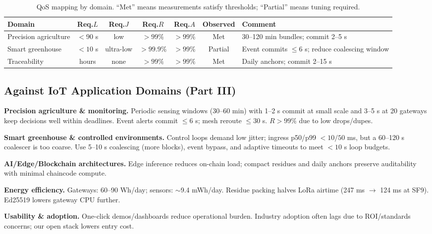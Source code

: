 \documentclass[12pt,onecolumn]{IEEEtran} %
\begin{document}
\begingroup
\setlength{\tabcolsep}{3pt}\footnotesize
\begin{table}[ht]
  \centering
  \caption{QoS mapping by domain. ``Met'' means measurements satisfy thresholds; ``Partial'' means tuning required.}
  \label{tab:qos-map}
  \begin{tabularx}{\textwidth}{l c c c c c X}
    \toprule
    \textbf{Domain} & \textbf{Req.\(L\)} & \textbf{Req.\(J\)} & \textbf{Req.\(R\)} & \textbf{Req.\(A\)} & \textbf{Observed} & \textbf{Comment} \\
    \midrule
    Precision agriculture & $<90$ s & low & $>99\%$ & $>99\%$ & Met & 30–120 min bundles; commit 2–5 s \\
    Smart greenhouse & $<10$ s & ultra-low & $>99.9\%$ & $>99\%$ & Partial & Event commits \(\le\)6 s; reduce coalescing window \\
    Traceability & hours & none & $>99\%$ & $>99\%$ & Met & Daily anchors; commit 2–15 s \\
    \bottomrule
  \end{tabularx}
\end{table}
\endgroup

\subsection{Against IoT Application Domains (Part III)}
\label{subsec:domains}
\textbf{Precision agriculture \& monitoring.} Periodic sensing windows (30–60 min) with 1–2 s commit at small scale and 3–5 s at 20 gateways keep decisions well within deadlines. Event alerts commit \(\le\)6 s; mesh reroute \(\le\)30 s. \(R>99\%\) due to low drops/dupes.

\textbf{Smart greenhouse \& controlled environments.} Control loops demand low jitter; ingress p50/p99 \(<10/50\) ms, but a 60–120 s coalescer is too coarse. Use 5–10 s coalescing (more blocks), event bypass, and adaptive timeouts to meet \(<10\) s loop budgets.

\textbf{AI/Edge/Blockchain architectures.} Edge inference reduces on-chain load; compact residues and daily anchors preserve auditability with minimal chaincode compute.

\textbf{Energy efficiency.} Gateways: 60–90 Wh/day; sensors: \(\sim\)9.4 mWh/day. Residue packing halves LoRa airtime (247 ms \(\to\) 124 ms at SF9). Ed25519 lowers gateway CPU further.

\textbf{Usability \& adoption.} One-click demos/dashboards reduce operational burden. Industry adoption often lags due to ROI/standards concerns; our open stack lowers entry cost.
\end{document}
